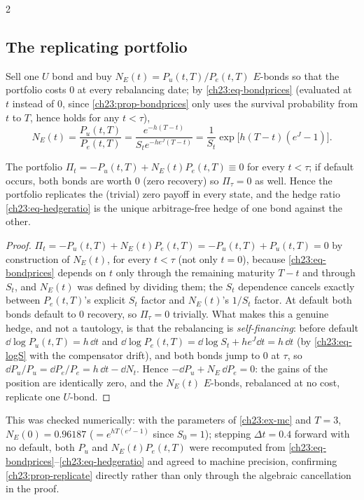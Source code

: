 \begin{paracol}{2}
\subsection{The replicating portfolio}\label{ch23:sec-replicate}
Sell one $U$ bond and buy $N_E(t)=P_u(t,T)/P_e(t,T)$ $E$-bonds so that the portfolio costs $0$ at every rebalancing
date; by \cref{ch23:eq-bondprices} (evaluated at $t$ instead of $0$, since \cref{ch23:prop-bondprices} only uses
the survival probability from $t$ to $T$, hence holds for any $t<\tau$),
\begin{equation}\label{ch23:eq-hedgeratio}
  N_E(t)=\frac{P_u(t,T)}{P_e(t,T)}=\frac{e^{-h(T-t)}}{S_te^{-he^J(T-t)}}=\frac{1}{S_t}\exp\bigl[h(T-t)(e^J-1)\bigr].
\end{equation}
\begin{proposition}\label{ch23:prop-replicate}
The portfolio $\Pi_t=-P_u(t,T)+N_E(t)P_e(t,T)\equiv0$ for every $t<\tau$; if default occurs, both bonds are worth
$0$ (zero recovery) so $\Pi_\tau=0$ as well. Hence the portfolio replicates the (trivial) zero payoff in every
state, and the hedge ratio \cref{ch23:eq-hedgeratio} is the unique arbitrage-free hedge of one bond against the
other.
\end{proposition}
\begin{proof}
$\Pi_t=-P_u(t,T)+N_E(t)P_e(t,T)=-P_u(t,T)+P_u(t,T)=0$ by construction of $N_E(t)$, for every $t<\tau$ (not only
$t=0$), because \cref{ch23:eq-bondprices} depends on $t$ only through the remaining maturity $T-t$ and through
$S_t$, and $N_E(t)$ was defined by dividing them; the $S_t$ dependence cancels exactly between $P_e(t,T)$'s
explicit $S_t$ factor and $N_E(t)$'s $1/S_t$ factor. At default both bonds default to $0$ recovery, so $\Pi_\tau=0$
trivially. What makes this a genuine hedge, and not a tautology, is that the rebalancing is \emph{self-financing}:
before default $\dd\log P_u(t,T)=h\,\dd t$ and $\dd\log P_e(t,T)=\dd\log S_t+he^J\dd t=h\,\dd t$ (by
\cref{ch23:eq-logS} with the compensator drift), and both bonds jump to $0$ at $\tau$, so
$\dd P_u/P_{u}=\dd P_e/P_{e}=h\,\dd t-\dd N_t$. Hence $-\dd P_u+N_E\,\dd P_e=0$: the gains of the position are
identically zero, and the $N_E(t)$ $E$-bonds, rebalanced at no cost, replicate one $U$-bond.
\end{proof}
This was checked numerically: with the parameters of \cref{ch23:ex-mc} and $T=3$, $N_E(0)=0.96187$
($=e^{h T(e^J-1)}$ since $S_0=1$); stepping $\Delta t=0.4$ forward with no default, both $P_u$ and $N_E(t)P_e(t,T)$
were recomputed from \cref{ch23:eq-bondprices}--\eqref{ch23:eq-hedgeratio} and agreed to machine precision, confirming \cref{ch23:prop-replicate} directly rather than only through the algebraic
cancellation in the proof.


\end{paracol}
